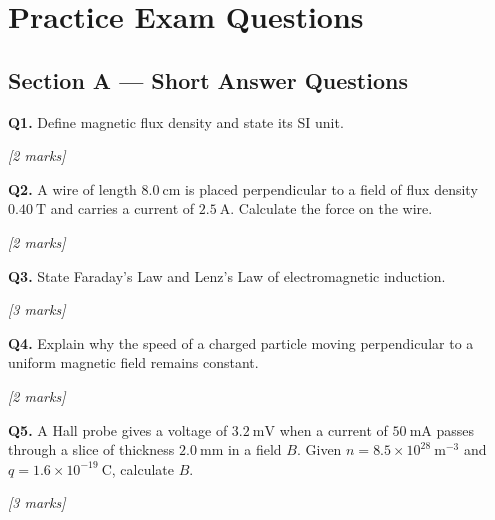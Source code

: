 \section{Practice Exam Questions}

\subsection*{Section A — Short Answer Questions}

\begin{tcolorbox}[colback=white, colframe=midblue, breakable]

\begin{minipage}{\linewidth}
\textbf{Q1.} Define magnetic flux density and state its SI unit.
\par\hfill\textit{[2 marks]}
\vspace{2.5cm}
\end{minipage}

\begin{minipage}{\linewidth}
\textbf{Q2.} A wire of length $8.0\ \text{cm}$ is placed perpendicular to a field of flux density $0.40\ \text{T}$ and carries a current of $2.5\ \text{A}$. Calculate the force on the wire.
\par\hfill\textit{[2 marks]}
\vspace{2.5cm}
\end{minipage}

\begin{minipage}{\linewidth}
\textbf{Q3.} State Faraday's Law and Lenz's Law of electromagnetic induction.
\par\hfill\textit{[3 marks]}
\vspace{3cm}
\end{minipage}

\begin{minipage}{\linewidth}
\textbf{Q4.} Explain why the speed of a charged particle moving perpendicular to a uniform magnetic field remains constant.
\par\hfill\textit{[2 marks]}
\vspace{3cm}
\end{minipage}

\begin{minipage}{\linewidth}
\textbf{Q5.} A Hall probe gives a voltage of $3.2\ \text{mV}$ when a current of $50\ \text{mA}$ passes through a slice of thickness $2.0\ \text{mm}$ in a field $B$. Given $n = 8.5\times10^{28}\ \text{m}^{-3}$ and $q = 1.6\times10^{-19}\ \text{C}$, calculate $B$.
\par\hfill\textit{[3 marks]}
\vspace{3.5cm}
\end{minipage}

\end{tcolorbox}

